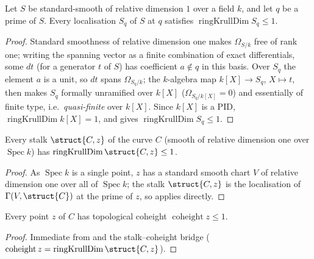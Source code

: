 \begin{lemma}
  \label{lem:adelic_relDimOne_dim_le_one}
  \leanok
  Let \(S\) be standard-smooth of relative dimension \(1\) over a field
  \(k\), and let \(q\) be a prime of \(S\). Every localisation \(S_q\)
  of \(S\) at \(q\) satisfies \(\operatorname{ringKrullDim} S_q \le 1\).
\end{lemma}
\begin{proof}
  \leanok
  Standard smoothness of relative dimension one makes \(\Omega_{S/k}\)
  free of rank one; writing the spanning vector as a finite combination
  of exact differentials, some \(dt\) (for a generator \(t\) of \(S\))
  has coefficient \(a \notin q\) in this basis. Over \(S_q\) the element
  \(a\) is a unit, so \(dt\) spans \(\Omega_{S_q/k}\); the \(k\)-algebra
  map \(k[X] \to S_q\), \(X \mapsto t\), then makes \(S_q\) formally
  unramified over \(k[X]\) (\(\Omega_{S_q/k[X]} = 0\)) and essentially
  of finite type, i.e.\ \emph{quasi-finite} over \(k[X]\). Since
  \(k[X]\) is a PID, \(\operatorname{ringKrullDim} k[X] = 1\), and
   gives
  \(\operatorname{ringKrullDim} S_q \le 1\).
\end{proof}

\begin{lemma}
  \label{lem:adelic_curve_stalk_dim_le_one}
  \leanok
  Every stalk \(\struct{C, z}\) of the curve \(C\) (smooth of relative
  dimension one over \(\operatorname{Spec} k\)) has
  \(\operatorname{ringKrullDim} \struct{C, z} \le 1\).
\end{lemma}
\begin{proof}
  \leanok
  As \(\operatorname{Spec} k\) is a single point, \(z\) has a standard
  smooth chart \(V\) of relative dimension one over all of
  \(\operatorname{Spec} k\); the stalk \(\struct{C, z}\) is the
  localisation of \(\Gamma(V, \struct{C})\) at the prime of \(z\), so
   applies directly.
\end{proof}

\begin{lemma}
  \label{lem:adelic_curve_coheight_le_one}
  \leanok
  Every point \(z\) of \(C\) has topological coheight
  \(\operatorname{coheight} z \le 1\).
\end{lemma}
\begin{proof}
  \leanok
  Immediate from  and the
  stalk--coheight bridge 
  (\(\operatorname{coheight} z = \operatorname{ringKrullDim}
  \struct{C, z}\)).
\end{proof}

